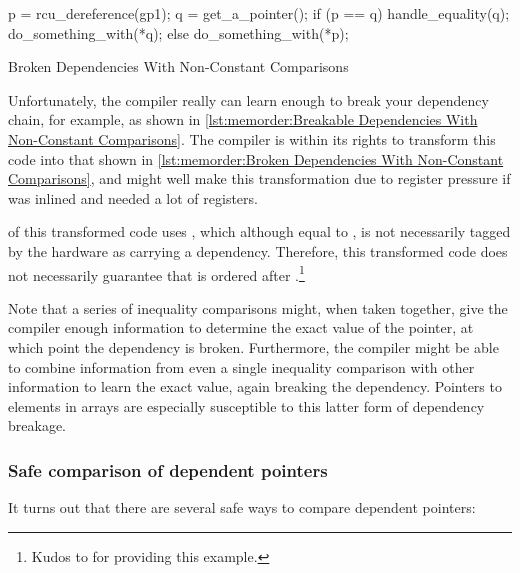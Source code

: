 {{\begin{listing}
\begin{fcvlabel}
\begin{VerbatimL}[commandchars=\\\[\]]
p = rcu_dereference(gp1);		\lnlbl[p]
q = get_a_pointer();
if (p == q) {
	handle_equality(q);
	do_something_with(*q);		\lnlbl[q]
} else {
	do_something_with(*p);
}
\end{VerbatimL}
\end{fcvlabel}
\caption{Broken Dependencies With Non-Constant Comparisons}
\label{lst:memorder:Broken Dependencies With Non-Constant Comparisons}
\end{listing}%
%
	Unfortunately, the compiler really can learn enough to
	break your dependency chain, for example, as shown in
	\cref{lst:memorder:Breakable Dependencies With Non-Constant Comparisons}.
	The compiler is within its rights to transform this code
	into that shown in
	\cref{lst:memorder:Broken Dependencies With Non-Constant Comparisons},
	and might well make this transformation due to register pressure
	if  was inlined and needed a lot of registers.
	\begin{fcvref}
	 of this transformed code uses , which although
	equal to , is not necessarily tagged by the hardware as
	carrying a dependency.
	Therefore, this transformed code does not necessarily guarantee
	that  is ordered after .\footnote{
		Kudos to  for providing this example.}
	\end{fcvref}
}\QuickQuizEndE
}

Note that a series of inequality comparisons might, when taken together,
give the compiler enough information to determine the exact value of
the pointer, at which point the dependency is broken.
Furthermore, the compiler might be able to combine information from
even a single inequality comparison with other information to learn
the exact value, again breaking the dependency.
Pointers to elements in arrays are especially susceptible to this latter
form of dependency breakage.

\subsubsection{Safe comparison of dependent pointers}
It turns out that there are several safe ways to compare dependent
pointers:

